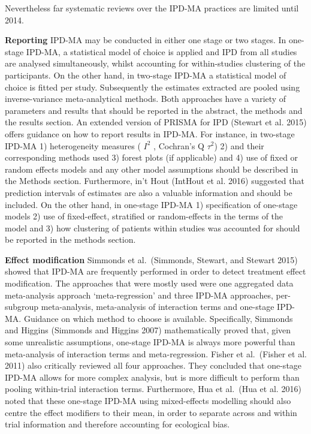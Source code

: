 \documentclass[]{article}
\begin{document}
Nevertheless far systematic reviews over the IPD-MA practices are
limited until 2014.

\textbf{Reporting} IPD-MA may be conducted in either one stage or two
stages. In one-stage IPD-MA, a statistical model of choice is applied
and IPD from all studies are analysed simultaneously, whilst accounting
for within-studies clustering of the participants. On the other hand, in
two-stage IPD-MA a statistical model of choice is fitted per study.
Subsequently the estimates extracted are pooled using inverse-variance
meta-analytical methods. Both approaches have a variety of parameters
and results that should be reported in the abstract, the methods and the
results section. An extended version of PRISMA for IPD (Stewart et al.
2015) offers guidance on how to report results in IPD-MA. For instance,
in two-stage IPD-MA 1) heterogeneity measures ( \(I^2\) , Cochran's Q
\(\tau^2\)) 2) and their corresponding methods used 3) forest plots (if
applicable) and 4) use of fixed or random effects models and any other
model assumptions should be described in the Methods section.
Furthermore, in't Hout (IntHout et al. 2016) suggested that prediction
intervals of estimates are also a valuable information and should be
included. On the other hand, in one-stage IPD-MA 1) specification of
one-stage models 2) use of fixed-effect, stratified or random-effects in
the terms of the model and 3) how clustering of patients within studies
was accounted for should be reported in the methods section.

\textbf{Effect modification} Simmonds et al.~(Simmonds, Stewart, and
Stewart 2015) showed that IPD-MA are frequently performed in order to
detect treatment effect modification. The approaches that were mostly
used were one aggregated data meta-analysis approach `meta-regression'
and three IPD-MA approaches, per-subgroup meta-analysis, meta-analysis
of interaction terms and one-stage IPD-MA. Guidance on which method to
choose is available. Specifically, Simmonds and Higgins (Simmonds and
Higgins 2007) mathematically proved that, given some unrealistic
assumptions, one-stage IPD-MA is always more powerful than meta-analysis
of interaction terms and meta-regression. Fisher et al.~(Fisher et al.
2011) also critically reviewed all four approaches. They concluded that
one-stage IPD-MA allows for more complex analysis, but is more difficult
to perform than pooling within-trial interaction terms. Furthermore, Hua
et al.~(Hua et al. 2016) noted that these one-stage IPD-MA using
mixed-effects modelling should also centre the effect modifiers to their
mean, in order to separate across and within trial information and
therefore accounting for ecological bias.
\end{document}
